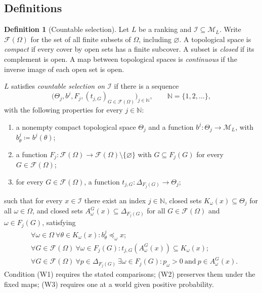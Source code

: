 \documentclass[11pt]{article}
\theoremstyle{definition}
\newtheorem{definition}[theorem]{Definition}
\theoremstyle{remark}
\newcommand{\M}{\mathcal M}
\newcommand{\I}{\mathcal I}
\begin{document}
\subsection{Definitions}

\begin{definition}[Countable selection]\label{def:selection}\label{def:family}
Let $L$ be a ranking and $\I\subseteq\M_L$. Write $\mathcal F(\Omega)$ for the set of all finite subsets of $\Omega$, including $\varnothing$. A topological space is \emph{compact} if every cover by open sets has a finite subcover. A subset is \emph{closed} if its complement is open. A map between topological spaces is \emph{continuous} if the inverse image of each open set is open.

$L$ satisfies \emph{countable selection on $\I$} if there is a sequence
\[
\bigl(\Theta_j,b^j,F_j,(t_{j,G})_{G\in\mathcal F(\Omega)}\bigr)_{j\in\mathbb N},\qquad \mathbb N=\{1,2,\ldots\},
\]
with the following properties for every $j\in\mathbb N$:
\begin{enumerate}[label=(\roman*)]
\item a nonempty compact topological space $\Theta_j$ and a function $b^j:\Theta_j\to\M_L$, with $b^j_\theta\coloneqq b^j(\theta)$;
\item a function $F_j:\mathcal F(\Omega)\to\mathcal F(\Omega)\setminus\{\varnothing\}$ with $G\subseteq F_j(G)$ for every $G\in\mathcal F(\Omega)$;
\item for every $G\in\mathcal F(\Omega)$, a function $t_{j,G}:\Delta_{F_j(G)}\to\Theta_j$;
\end{enumerate}
such that for every $x\in\I$ there exist an index $j\in\mathbb N$, closed sets $K_\omega(x)\subseteq\Theta_j$ for all $\omega\in\Omega$, and closed sets $A^G_\omega(x)\subseteq\Delta_{F_j(G)}$ for all $G\in\mathcal F(\Omega)$ and $\omega\in F_j(G)$, satisfying
\begin{align}
&\forall\omega\in\Omega\ \forall\theta\in K_\omega(x):
 b^j_\theta\preceq_\omega x;\tag{W1}\label{eq:comparison}\\
&\forall G\in\mathcal F(\Omega)\ \forall\omega\in F_j(G):
 t_{j,G}(A^G_\omega(x))\subseteq K_\omega(x);\tag{W2}\label{eq:compatibility}\\
&\forall G\in\mathcal F(\Omega)\ \forall p\in\Delta_{F_j(G)}\
 \exists\omega\in F_j(G):
 p_\omega>0\ \text{and}\ p\in A^G_\omega(x).\tag{W3}\label{eq:support}
\end{align}
Condition (W1) requires the stated comparisons; (W2) preserves them under the fixed maps; (W3) requires one at a world given positive probability.


\end{definition}
\end{document}
